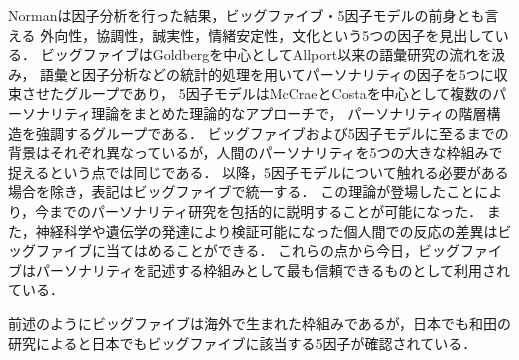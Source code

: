 Norman\cite{norman}は因子分析を行った結果，ビッグファイブ・5因子モデルの前身とも言える
外向性，協調性，誠実性，情緒安定性，文化という5つの因子を見出している．
ビッグファイブはGoldberg\cite{goldberg-1981, goldberg-1990, goldberg-1992}を中心としてAllport以来の語彙研究の流れを汲み，
語彙と因子分析などの統計的処理を用いてパーソナリティの因子を5つに収束させたグループであり，
5因子モデルはMcCraeとCosta\cite{mccrae-1987, mccrae-1992}を中心として複数のパーソナリティ理論をまとめた理論的なアプローチで，
パーソナリティの階層構造を強調するグループである\cite{first-personality}．
ビッグファイブおよび5因子モデルに至るまでの背景はそれぞれ異なっているが，人間のパーソナリティを5つの大きな枠組みで捉えるという点では同じである．
以降，5因子モデルについて触れる必要がある場合を除き，表記はビッグファイブで統一する．
この理論が登場したことにより，今までのパーソナリティ研究を包括的に説明することが可能になった．
また，神経科学や遺伝学の発達により検証可能になった個人間での反応の差異はビッグファイブに当てはめることができる．
これらの点から今日，ビッグファイブはパーソナリティを記述する枠組みとして最も信頼できるものとして利用されている．

前述のようにビッグファイブは海外で生まれた枠組みであるが，日本でも和田\cite{wada}の研究によると日本でもビッグファイブに該当する5因子が確認されている．


